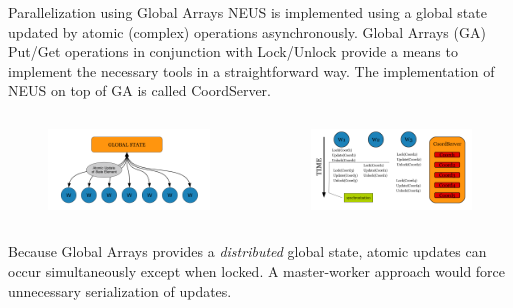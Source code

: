 \documentclass[final]{beamer}
\begin{document}
\begin{columns}[t]
\begin{column}{.33 \linewidth}
        \begin{block}{\Large Parallelization using Global Arrays}\large
            NEUS is implemented using a global state updated by atomic (complex) operations asynchronously.  Global Arrays (GA) Put/Get operations in conjunction with Lock/Unlock provide a means to implement the necessary tools in a straightforward way.  The implementation of NEUS on top of GA is called CoordServer.
            \begin{columns}[t]
                \begin{column}{.48 \linewidth}
                    \begin{figure}[hctp]
                        \includegraphics[width=1.0\linewidth]{images/soft_arch.png}
                    \end{figure}
                \end{column}
                \begin{column}{.48\linewidth}
                    \begin{figure}[hctp]
                        \includegraphics[width=1.0\linewidth]{images/coord_server.png}
                    \end{figure}
                \end{column}
            \end{columns}
            Because Global Arrays provides a \textit{distributed} global state, atomic updates can occur simultaneously except when locked.  A master-worker approach would force unnecessary serialization of updates.
        \end{block}


\end{column}
\end{columns}
\end{document}
